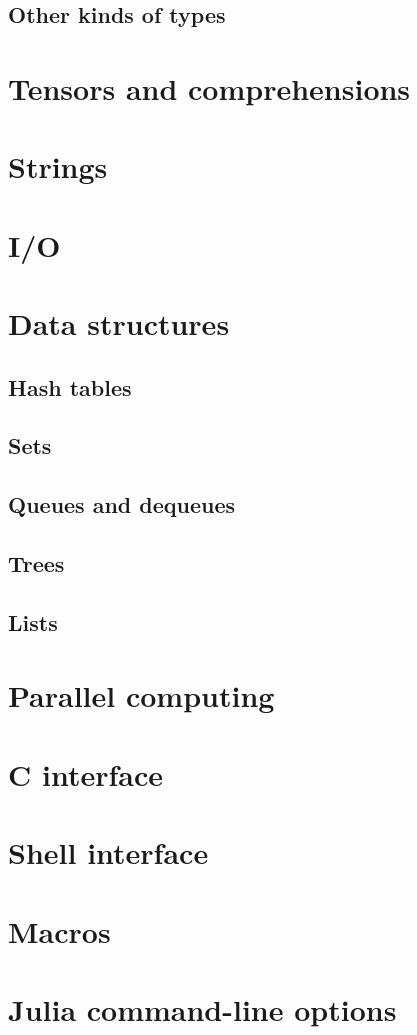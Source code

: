 \documentclass{article}
\begin{document}
\subsection{Other kinds of types}
\section{Tensors and comprehensions}
\section{Strings}
\section{I/O}
\section{Data structures}
\subsection{Hash tables}
\subsection{Sets}
\subsection{Queues and dequeues}
\subsection{Trees}
\subsection{Lists}
\section{Parallel computing}
\section{C interface}
\section{Shell interface}
\section{Macros}
\section{Julia command-line options}
\end{document}
